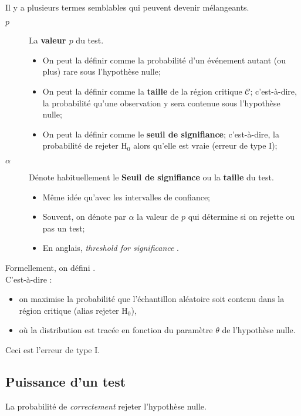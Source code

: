 \documentclass[10pt, french]{article}
\begin{document}
\begin{multicols*}{2}
\

Il y a plusieurs termes semblables qui peuvent devenir mélangeants.
\begin{distributions}[Terminologie]
\begin{description}
	\item[$p$]	La \textbf{valeur $p$} du test.
		\begin{itemize}
		\item	On peut la définir comme la probabilité d'un événement autant (ou plus) rare sous l'hypothèse nulle;
		\item	On peut la définir comme la \textbf{taille} de la région critique $\mathcal{C}$; c'est-à-dire, la probabilité qu'une observation y sera contenue sous l'hypothèse nulle;
		\item	On peut la définir comme le \textbf{seuil de signifiance}; c'est-à-dire, la probabilité de rejeter $\text{H}_{0}$ alors qu'elle est vraie (erreur de type I);
		\end{itemize}
	\item[$\alpha$]	Dénote habituellement le \textbf{Seuil de signifiance} ou la \textbf{taille} du test.
		\begin{itemize}
		\item	Même idée qu'avec les intervalles de confiance;
		\item	Souvent, on dénote par $\alpha$ la valeur de $p$ qui détermine si on rejette ou pas un test;
		\item	En anglais, \og \textit{threshold for significance} \fg{}.
		\end{itemize}
\end{description}
\end{distributions}

Formellement, on défini . \\
C'est-à-dire :
\begin{itemize}
	\item	on maximise la probabilité que l'échantillon aléatoire soit contenu dans la région critique (alias rejeter $\textrm{H}_{0}$), 
	\item	où la distribution est tracée en fonction du paramètre $\theta$ de l'hypothèse nulle.
\end{itemize}
Ceci est l'erreur de type I.


\columnbreak
\subsection{Puissance d'un test}
\begin{definitionNOHFILL}
La probabilité de \textit{correctement} rejeter l'hypothèse nulle.


\end{definitionNOHFILL}
\end{multicols*}
\end{document}
